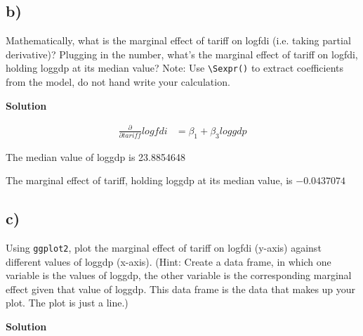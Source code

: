 \documentclass{article}\usepackage[]{graphicx}\usepackage[]{color}
\begin{document}
\subsection*{b)}

Mathematically, what is the marginal effect of tariff on logfdi (i.e. taking partial derivative)? Plugging in the number, what's the marginal effect of tariff on logfdi, holding loggdp at its median value? Note: Use \verb`\Sexpr()` to extract coefficients from the model, do not hand write your calculation.

\textbf{Solution}

\begin{align}
\frac{\partial}{\partial tariff} logfdi &= \beta_1 + \beta_3 loggdp
\end{align}

The median value of loggdp is 23.8854648

The marginal effect of tariff, holding loggdp at its median value, is \ensuremath{-0.0437074}

\subsection*{c)}

Using \verb`ggplot2`, plot the marginal effect of tariff on logfdi (y-axis) against different values of loggdp (x-axis). (Hint: Create a data frame, in which one variable is the values of loggdp, the other variable is the corresponding marginal effect given that value of loggdp. This data frame is the data that makes up your plot. The plot is just a line.)

\textbf{Solution}
\end{document}
